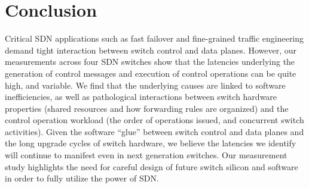 \section{Conclusion}
\label{sec:conclusion}
Critical SDN applications such as fast failover and fine-grained traffic engineering demand
tight interaction between switch control and data planes. 
However, our measurements across four SDN switches show that the
latencies underlying the generation of control messages and execution of control operations can be quite high, and
variable. We find that the underlying causes are linked to
software inefficiencies, as well as pathological interactions between
switch hardware properties (shared resources and how forwarding rules
are organized) and the control operation workload (the order of
operations issued, and concurrent switch activities). 
Given the software ``glue'' between switch control and data planes and 
the long upgrade cycles of switch hardware, we believe the latencies we identify will continue to 
manifest even in next generation switches. 
Our measurement study highlights the need for careful design of 
future switch silicon and software in order to fully utilize the power of SDN.

\iffalse
Finally, to mitigate the
challenges these latencies create for SDN in supporting critical
management applications, we present three measurement-driven techniques.
Our evaluation shows that these mechanisms can tame flow setup
latencies effectively, thereby enabling SDN-based control of critical
applications.
\fi


